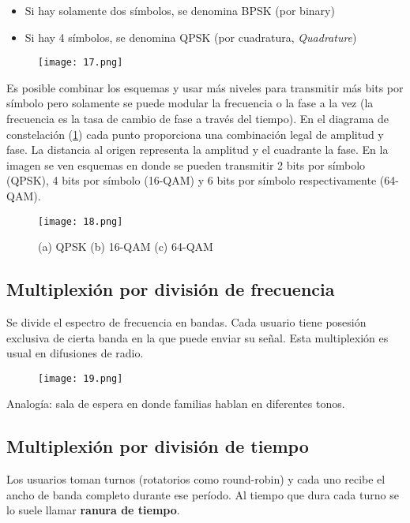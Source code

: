 \documentclass{book}
\begin{document}
	\begin{itemize}
		\item Si hay solamente dos símbolos, se denomina BPSK (por binary)
		\item Si hay 4 símbolos, se denomina QPSK (por cuadratura, \textit{Quadrature})
	\end{itemize}
	
	\begin{figure}[H]
		\centering
		\texttt{[image: 17.png]}
	\end{figure}
	
	Es posible combinar los esquemas y usar más niveles para transmitir más bits por símbolo pero solamente se puede modular la frecuencia o la fase a la vez (la frecuencia es la tasa de cambio de fase a través del tiempo). En el diagrama de constelación (\ref{fig:QPSK}) cada punto proporciona una combinación legal de amplitud y fase. La distancia al origen representa la amplitud y el cuadrante la fase. En la imagen se ven esquemas en donde se pueden transmitir 2 bits por símbolo (QPSK), 4 bits por símbolo (16-QAM) y 6 bits por símbolo respectivamente (64-QAM).
	
	\begin{figure}[H]
		\centering
		\texttt{[image: 18.png]}
		\caption{(a) QPSK (b) 16-QAM (c) 64-QAM}
		\label{fig:QPSK}
	\end{figure}
	
	\pagebreak
	\subsection{Multiplexión por división de frecuencia}
	Se divide el espectro de frecuencia en bandas. Cada usuario tiene posesión exclusiva de cierta banda en la que puede enviar su señal. Esta multiplexión es usual en difusiones de radio.
	
	\begin{figure}[H]
		\centering
		\texttt{[image: 19.png]}
	\end{figure}
	
	\vspace{3mm}
	Analogía: sala de espera en donde familias hablan en diferentes tonos.
	
	\subsection{Multiplexión por división de tiempo}
	Los usuarios toman turnos (rotatorios como round-robin) y cada uno recibe el ancho de banda completo durante ese período. Al tiempo que dura cada turno se lo suele llamar \textbf{ranura de tiempo}.
	
\end{document}
